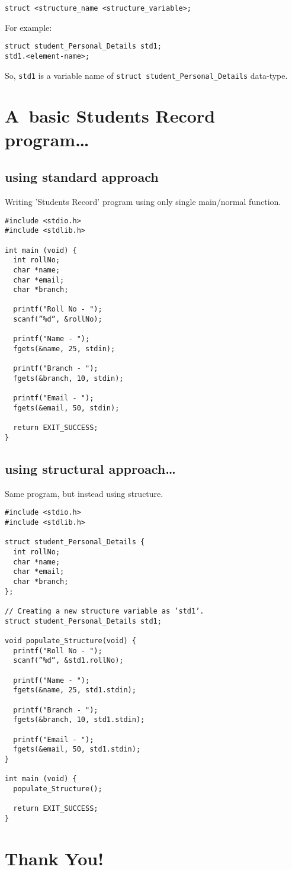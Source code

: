 \documentclass[11pt]{article}
\begin{document}
\begin{verbatim}
struct <structure_name <structure_variable>; 
\end{verbatim}

For example:

\begin{verbatim}
struct student_Personal_Details std1;
std1.<element-name>; 
\end{verbatim}

So, \texttt{std1} is a variable name of \texttt{struct student\_Personal\_Details} data-type.

\section{A basic Students Record program…}
\label{sec:orgdb0b27b}

\subsection{using standard approach}
\label{sec:orgdadba5d}

Writing ’Students Record’ program using only single main/normal function.

\begin{verbatim}
#include <stdio.h>
#include <stdlib.h>

int main (void) {
  int rollNo;
  char *name;
  char *email;
  char *branch;

  printf("Roll No - ");
  scanf(”%d“, &rollNo);

  printf("Name - ");
  fgets(&name, 25, stdin);

  printf("Branch - ");
  fgets(&branch, 10, stdin);

  printf("Email - ");
  fgets(&email, 50, stdin);

  return EXIT_SUCCESS;
}
\end{verbatim}

\subsection{using structural approach…}
\label{sec:org76ed6d5}

Same program, but instead using structure.

\begin{verbatim}
#include <stdio.h>
#include <stdlib.h>

struct student_Personal_Details {
  int rollNo;
  char *name;
  char *email;
  char *branch;
};

// Creating a new structure variable as ’std1’.
struct student_Personal_Details std1;

void populate_Structure(void) {
  printf("Roll No - ");
  scanf(”%d“, &std1.rollNo);

  printf("Name - ");
  fgets(&name, 25, std1.stdin);

  printf("Branch - ");
  fgets(&branch, 10, std1.stdin);

  printf("Email - ");
  fgets(&email, 50, std1.stdin);
}

int main (void) {
  populate_Structure();

  return EXIT_SUCCESS;
}
\end{verbatim}

\section{Thank You!}
\label{sec:org530434c}
\end{document}
